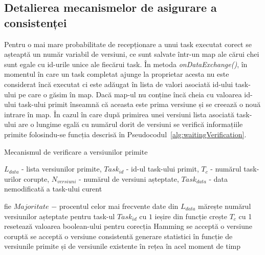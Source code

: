\documentclass[12pt,a4paper]{report}
\begin{document}
\subsection{Detalierea mecanismelor de asigurare a consistenței}

Pentru o mai mare probabilitate de recepționare a unui task executat corect se așteaptă un număr variabil de versiuni, ce sunt salvate într-un map ale cărui chei sunt egale cu id-urile unice ale fiecărui task.
În metoda \textit{onDataExchange()}, în momentul în care un task completat ajunge la proprietar acesta nu este considerat încă executat ci este adăugat în lista de valori asociată id-ului task-ului pe care o găsim în map. Dacă map-ul nu conține încă cheia cu valoarea id-ului task-ului primit înseamnă că aceasta este prima versiune și se creează o nouă intrare în map. În cazul în care după primirea unei versiuni lista asociată task-ului are o lungime egală cu numărul dorit de versiuni se verifică informațiile primite folosindu-se funcția descrisă în Pseudocodul~\ref{alg:waitingVerification}.
\iftrue
\begin{algorithm}
\caption{Mecanismul de verificare a versiunilor primite}
\label{alg:waitingVerification}
\begin{algorithmic}[1]
\scriptsize
\State $L_{data}$ - lista versiunilor primite, $Task_{id}$ - id-ul task-ului primit, $T_{c}$ - numărul task-urilor corupte, $N_{versiuni}$ - numărul de versiuni așteptate, $Task_{data}$ - data nemodificată a task-ului curent

	\State fie $Majoritate$ $-$ procentul celor mai frecvente date din $L_{data}$
		\State mărește numărul versiunilor așteptate pentru task-ul $Task_{id}$ cu $1$
		\State ieșire din funcție
	\EndIf
			\State crește $T_{c}$ cu 1
			\State resetează valoarea boolean-ului pentru corecția Hamming
		\EndIf
	\EndFor
		\State se acceptă o versiune coruptă
	\Else {} se acceptă o versiune consistentă
	\EndIf
	\State generare statistici în funcție de versiunile primite și de versiunile existente în rețea în acel moment de timp
\end{algorithmic}
\end{algorithm}    
\fi
\end{document}
